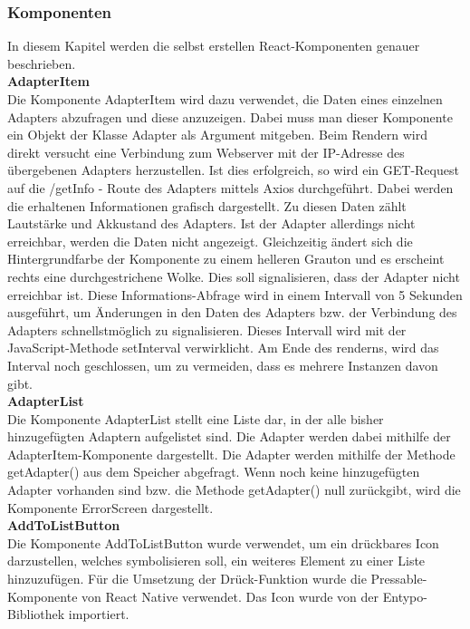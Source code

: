 \documentclass[11pt, twoside]{article}
\begin{document}
\subsubsection{Komponenten}
In diesem Kapitel werden die selbst erstellen React-Komponenten genauer beschrieben. \newline \\
\textbf{AdapterItem} \\
Die Komponente AdapterItem wird dazu verwendet, die Daten eines einzelnen Adapters abzufragen und diese anzuzeigen. Dabei muss man dieser Komponente ein Objekt der Klasse Adapter als Argument mitgeben. Beim Rendern wird direkt versucht eine Verbindung zum Webserver mit der IP-Adresse des übergebenen Adapters herzustellen. Ist dies erfolgreich, so wird ein GET-Request auf die /getInfo - Route des Adapters mittels Axios durchgeführt. Dabei werden die erhaltenen Informationen grafisch dargestellt. Zu diesen Daten zählt Lautstärke und Akkustand des Adapters. Ist der Adapter allerdings nicht erreichbar, werden die Daten nicht angezeigt. Gleichzeitig ändert sich die Hintergrundfarbe der Komponente zu einem helleren Grauton und es erscheint rechts eine durchgestrichene Wolke. Dies soll signalisieren, dass der Adapter nicht erreichbar ist. Diese Informations-Abfrage wird in einem Intervall von 5 Sekunden ausgeführt, um Änderungen in den Daten des Adapters bzw. der Verbindung des Adapters schnellstmöglich zu signalisieren. Dieses Intervall wird mit der JavaScript-Methode setInterval verwirklicht. Am Ende des renderns, wird das Interval noch geschlossen, um zu vermeiden, dass es mehrere Instanzen davon gibt. \newline \\
\textbf{AdapterList} \\
Die Komponente AdapterList stellt eine Liste dar, in der alle bisher hinzugefügten Adaptern aufgelistet sind. Die Adapter werden dabei mithilfe der AdapterItem-Komponente dargestellt. Die Adapter werden mithilfe der Methode getAdapter() aus dem Speicher abgefragt. Wenn noch keine hinzugefügten Adapter vorhanden sind bzw. die Methode getAdapter() null zurückgibt, wird die Komponente ErrorScreen dargestellt. \newline \\
\textbf{AddToListButton} \\
Die Komponente AddToListButton wurde verwendet, um ein drückbares Icon darzustellen, welches symbolisieren soll, ein weiteres Element zu einer Liste hinzuzufügen. Für die Umsetzung der Drück-Funktion wurde die Pressable-Komponente von React Native verwendet. Das Icon wurde von der Entypo-Bibliothek importiert. \newline \\
\end{document}
